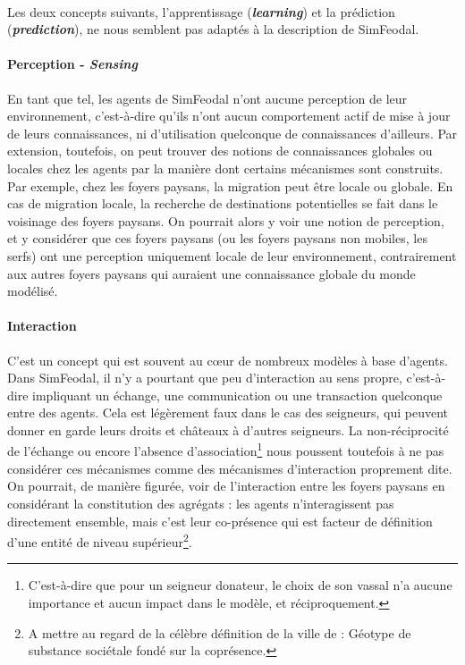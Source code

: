 \paragraph[Learning \& Prediction]{} Les deux concepts suivants, l'apprentissage (\textit{\textbf{learning}}) et la prédiction (\textit{\textbf{prediction}}), ne nous semblent pas adaptés à la description de SimFeodal.

\paragraph{Perception - \textit{Sensing}} En tant que tel, les agents de SimFeodal n'ont aucune perception de leur environnement, c'est-à-dire qu'ils n'ont aucun comportement \og actif\fg{} de mise à jour de leurs connaissances, ni d'utilisation quelconque de connaissances d'ailleurs.
Par extension, toutefois, on peut trouver des notions de connaissances globales ou locales chez les agents par la manière dont certains mécanismes sont construits.
Par exemple, chez les foyers paysans, la migration peut être locale ou globale. 
En cas de migration locale, la recherche de destinations potentielles se fait dans le voisinage des foyers paysans.
On pourrait alors y voir une notion de perception, et y considérer que ces foyers paysans (ou les foyers paysans non mobiles, les serfs) ont une perception uniquement locale de leur environnement, contrairement aux autres foyers paysans qui auraient une connaissance globale du monde modélisé.

\paragraph{Interaction} C'est un concept qui est souvent au cœur de nombreux modèles à base d'agents.
Dans SimFeodal, il n'y a pourtant que peu d'interaction au sens propre, c'est-à-dire impliquant un échange, une communication ou une transaction quelconque entre des agents.
Cela est légèrement faux dans le cas des seigneurs, qui peuvent donner en garde leurs droits et châteaux à d'autres seigneurs.
La non-réciprocité de l'échange ou encore l'absence d'\fg{}association\fg{}\footnote{
	C'est-à-dire que pour un seigneur donateur, le choix de son vassal n'a aucune importance et aucun impact dans le modèle, et réciproquement.
} nous poussent toutefois à ne pas considérer ces mécanismes comme des mécanismes d'interaction proprement dite.
On pourrait, de manière figurée, voir de l'interaction entre les foyers paysans en considérant la constitution des agrégats : les agents n'interagissent pas directement ensemble, mais c'est leur co-présence qui est facteur de définition d'une entité de niveau supérieur\footnote{
A mettre au regard de la célèbre définition de la ville de \textcite{levy_ville_2003} : \og Géotype de substance sociétale fondé sur la coprésence\fg{}.
}.
\setcounter{savefootnote}{\value{footnote}}

